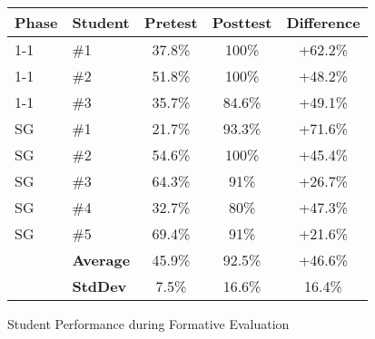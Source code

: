 \documentclass{sig-alternate}
\begin{document}
\begin{figure}
\begin{tabular}{l|l|c|c|c}
	Phase & Student & Pretest & Posttest & Difference\\\hline
	1-1 & \#1 & 37.8\% & 100\% & +62.2\%\\
	1-1 & \#2 & 51.8\% & 100\% & +48.2\%\\
	1-1 & \#3 & 35.7\% & 84.6\% & +49.1\%\\\hline
	SG & \#1 & 21.7\% & 93.3\% & +71.6\%\\
	SG & \#2 & 54.6\% & 100\% & +45.4\%\\
	SG & \#3 & 64.3\% & 91\% & +26.7\%\\
	SG & \#4 & 32.7\% & 80\% & +47.3\%\\
	SG & \#5 & 69.4\% & 91\% & +21.6\%\\\hline
	& \textbf{Average} & 45.9\% & 92.5\% & +46.6\%\\
	& \textbf{StdDev} & 7.5\% & 16.6\% & 16.4\%\\
\end{tabular}
\caption{Student Performance during Formative Evaluation}
\label{fe-results}
\end{figure}



 
\end{document}
